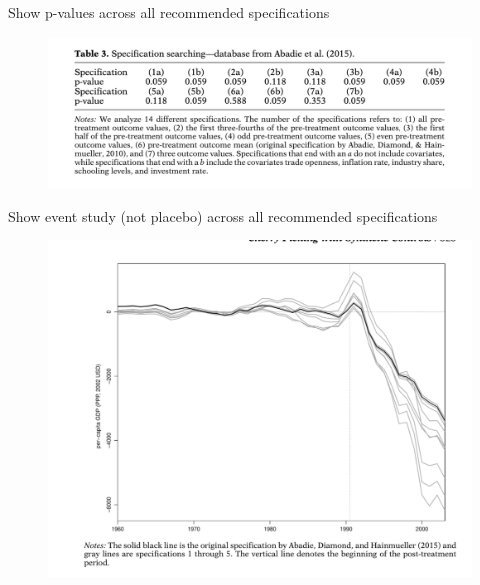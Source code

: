 \documentclass{beamer}
\begin{document}
\begin{frame}{Show p-values across all recommended specifications}

	\begin{figure}
	\includegraphics[scale=0.5]{./lecture_includes/cherry_picking_1.png}
	\end{figure}

\end{frame}

\begin{frame}{Show event study (not placebo) across all recommended specifications}

	\begin{figure}
	\includegraphics[scale=0.5]{./lecture_includes/cherry_picking_2.png}
	\end{figure}

\end{frame}
\end{document}

